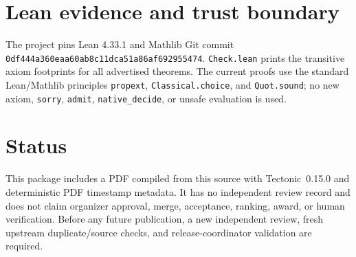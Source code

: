 \documentclass[11pt]{article}
\begin{document}
\section*{Lean evidence and trust boundary}
The project pins Lean 4.33.1 and Mathlib Git commit
\texttt{0df444a360eaa60ab8c11dca51a86af692955474}. \texttt{Check.lean} prints the transitive axiom footprints
for all advertised theorems. The current proofs use the standard Lean/Mathlib
principles \texttt{propext}, \texttt{Classical.choice}, and
\texttt{Quot.sound}; no new axiom, \texttt{sorry}, \texttt{admit},
\texttt{native\_decide}, or unsafe evaluation is used.

\section*{Status}
This package includes a PDF compiled from this source with Tectonic~0.15.0 and
deterministic PDF timestamp metadata. It has no independent review record and
does not claim organizer approval, merge, acceptance, ranking, award, or human
verification. Before any future publication, a new independent review, fresh
upstream duplicate/source checks, and release-coordinator validation are required.
\end{document}
